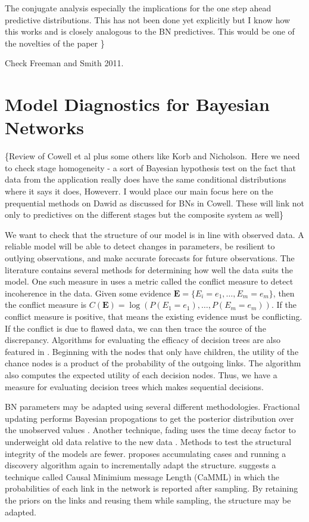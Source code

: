 \documentclass[12pt]{article}
\begin{document}
 The conjugate analysis especially the implications for the one step
ahead predictive distributions. This has not been done yet explicitly but I
know how this works and is closely analogous to the BN predictives. This
would be one of the novelties of the paper \}

Check Freeman and Smith 2011.



\section{Model Diagnostics for Bayesian Networks}

\{Review of Cowell et al plus some others like Korb and Nicholson.\ Here we
need to check stage homogeneity - a sort of Bayesian hypothesis test on the
fact that data from the application really does have the same conditional
distributions where it says it does, Howeverr. I would place our main focus
here on the prequential methods on Dawid as discussed for BNs in Cowell.
These will link not only to predictives on the different stages but the
composite system as well\}

We want to check that the structure of our model is in line with observed data. A reliable model will be able to detect changes in parameters, be resilient to outlying observations, and make accurate forecasts for future observations\cite{Dawid1984}. The literature contains several methods for determining how well the data suits the model. One such measure in \cite{KORB} uses a metric called the conflict measure to detect incoherence in the data. Given some evidence $\bm{E}=\{E_i=e_1,\ldots,E_m=e_m\}$, then the conflict measure is $C(\bm{E})=\log(P(E_1=e_1),\ldots,P(E_m=e_m))$. If the conflict measure is positive, that means the existing evidence must be conflicting. If the conflict is due to flawed data, we can then trace the source of the discrepancy. Algorithms for evaluating the efficacy of decision trees are also featured in \cite{KORB}. Beginning with the nodes that only have children, the utility of the chance nodes is a product of the probability of the outgoing links. The algorithm also computes the expected utility of each decision nodes. Thus, we have a measure for evaluating decision trees which makes sequential decisions. 

BN parameters may be adapted using several different methodologies. Fractional updating performs Bayesian propogations to get the posterior distribution over the unobserved values \cite{Spiegelhalter and Lauritzen}. Another technique, fading uses the time decay factor to underweight old data relative to the new data \cite{JENSEN}. Methods to test the structural integrity of the models are fewer. \cite{JENSEN} proposes accumulating cases and running a discovery algorithm again to incrementally adapt the structure. \cite{KORB} suggests a technique called Causal Minimium message Length (CaMML) in which the probabilities of each link in the network is reported after sampling. By retaining the priors on the links and reusing them while sampling, the structure may be adapted. 
\end{document}
